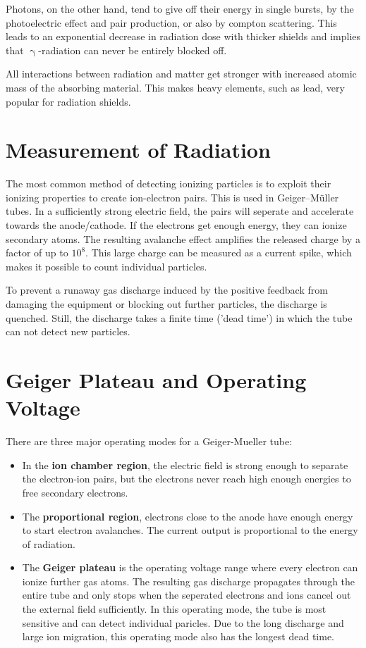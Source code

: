 Photons, on the other hand, tend to give off their energy in single bursts, by the photoelectric effect and pair production, or also by compton scattering.
This leads to an exponential decrease in radiation dose with thicker shields and implies that $\upgamma$-radiation can never be entirely blocked off.

All interactions between radiation and matter get stronger with increased atomic mass of the absorbing material.
This makes heavy elements, such as lead, very popular for radiation shields.

\section{Measurement of Radiation}\label{sec:geiger_shit}
The most common method of detecting ionizing particles is to exploit their ionizing properties to create ion-electron pairs.
This is used in Geiger–Müller tubes.
In a sufficiently strong electric field, the pairs will seperate and accelerate towards the anode/cathode.
If the electrons get enough energy, they can ionize secondary atoms.
The resulting avalanche effect amplifies the released charge by a factor of up to $10^8$.
This large charge can be measured as a current spike, which makes it possible to count individual particles.

To prevent a runaway gas discharge induced by the positive feedback from damaging the equipment or blocking out further particles, the discharge is quenched.
Still, the discharge takes a finite time ('dead time') in which the tube can not detect new particles.

\section{Geiger Plateau and Operating Voltage}
There are three major operating modes for a Geiger-Mueller tube:
\begin{itemize}
	\item In the \textbf{ion chamber region}, the electric field is strong enough to separate the electron-ion pairs, but the electrons never reach high enough energies to free secondary electrons.
	\item The \textbf{proportional region}, electrons close to the anode have enough energy to start electron avalanches. The current output is proportional to the energy of radiation.
	\item The \textbf{Geiger plateau} is the operating voltage range where every electron can ionize further gas atoms.
	The resulting gas discharge propagates through the entire tube and only stops when the seperated electrons and ions cancel out the external field sufficiently.
	In this operating mode, the tube is most sensitive and can detect individual paricles.
	Due to the long discharge and large ion migration, this operating mode also has the longest dead time.
\end{itemize}
